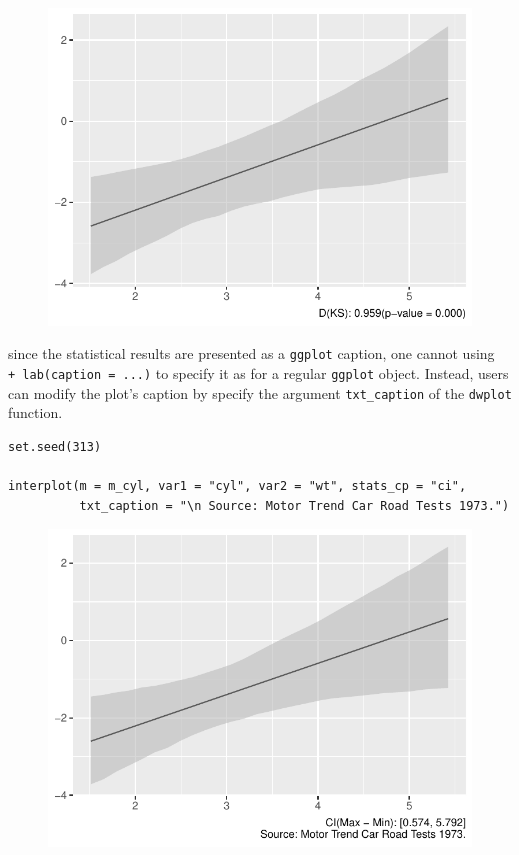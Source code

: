 \documentclass[
  article]{jss}
\begin{document}
\begin{figure}[H]

{\centering \includegraphics{jss_manuscript_files/figure-pdf/unnamed-chunk-15-1.pdf}

}

\end{figure}

since the statistical results are presented as a \texttt{ggplot}
caption, one cannot using \texttt{+\ lab(caption\ =\ ...)} to specify it
as for a regular \texttt{ggplot} object. Instead, users can modify the
plot's caption by specify the argument \texttt{txt\_caption} of the
\texttt{dwplot} function.

\begin{verbatim}
set.seed(313)

interplot(m = m_cyl, var1 = "cyl", var2 = "wt", stats_cp = "ci", 
          txt_caption = "\n Source: Motor Trend Car Road Tests 1973.")
\end{verbatim}

\begin{figure}[H]

{\centering \includegraphics{jss_manuscript_files/figure-pdf/unnamed-chunk-16-1.pdf}

}

\end{figure}
\end{document}
